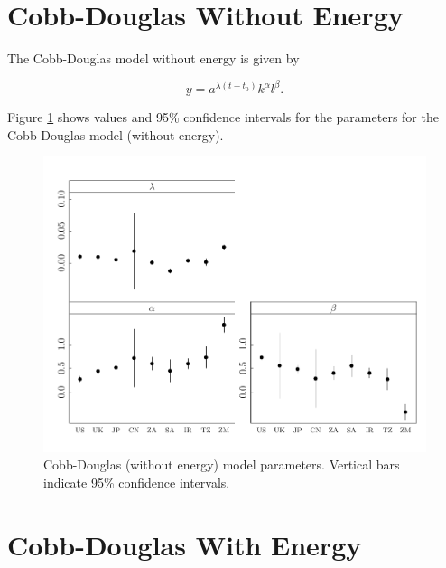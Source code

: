 \documentclass[preprint,authoryear,12pt]{elsarticle}\usepackage{graphicx, color}
\makeatletter
\def\maxwidth{ %
  \ifdim\Gin@nat@width>\linewidth
    \linewidth
  \else
    \Gin@nat@width
  \fi
}
\newenvironment{knitrout}{}{} %
\makeatother
\begin{document}
\section{Cobb-Douglas Without Energy}




The Cobb-Douglas model without energy is given by

\begin{equation} \label{eq:CD_No_Energy}
  y = a^{\lambda (t-t_0)}k^{\alpha}l^{\beta}.
\end{equation}

Figure \ref{fig:CD_Params_Graph} shows values and 95\% confidence intervals for the parameters for the Cobb-Douglas model (without energy).

\begin{knitrout}
\color{fgcolor}\begin{figure}[]

\includegraphics[width=\maxwidth]{figure/CD_Params_Graph} \caption[Cobb-Douglas (without energy) model parameters]{Cobb-Douglas (without energy) model parameters. Vertical bars indicate 95\% confidence intervals.\label{fig:CD_Params_Graph}}
\end{figure}


\end{knitrout}


\section{Cobb-Douglas With Energy}
\end{document}
